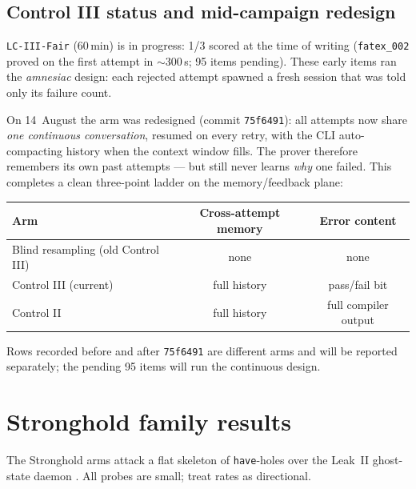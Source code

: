 \documentclass[12pt, a4paper]{article}
\newcommand{\run}[1]{\texttt{#1}}
\begin{document}
\subsection{Control III status and mid-campaign redesign}
\label{sec:c3}

\run{LC-III-Fair} (60\,min) is in progress: 1/3 scored at the time of writing
(\run{fatex\_002} proved on the first attempt in ${\sim}300$\,s; 95 items
pending). These early items ran the \emph{amnesiac} design: each rejected
attempt spawned a fresh session that was told only its failure count.

On 14~August the arm was redesigned (commit \run{75f6491}): all attempts now
share \emph{one continuous conversation}, resumed on every retry, with the CLI
auto-compacting history when the context window fills. The prover therefore
remembers its own past attempts --- but still never learns \emph{why} one
failed. This completes a clean three-point ladder on the memory/feedback
plane:

\begin{center}\small
\begin{tabular}{@{}lcc@{}}
\toprule
Arm & Cross-attempt memory & Error content \\
\midrule
Blind resampling (old Control III) & none & none \\
Control III (current) & full history & pass/fail bit \\
Control II & full history & full compiler output \\
\bottomrule
\end{tabular}
\end{center}

Rows recorded before and after \run{75f6491} are different arms and will be
reported separately; the pending 95 items will run the continuous design.

\section{Stronghold family results}
\label{sec:stronghold}

The Stronghold arms attack a flat skeleton of \texttt{have}-holes over the
Leak~II ghost-state daemon \cite{shen2026snapshot,aniva2024pantograph}. All
probes are small; treat rates as directional.
\end{document}
